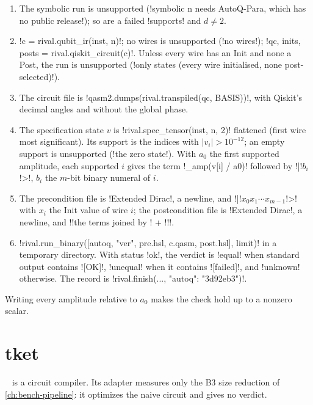 \begin{algorithm}\label{alg:bench-tools-autoq}
\begin{enumerate}
\item The symbolic run is unsupported (\code!symbolic n needs AutoQ-Para, which has no public release!); so are a failed \py!supports! and $d\neq2$.
\item \py!c = rival.qubit_ir(inst, n)!; no wires is unsupported (\code!no wires!); \py!qc, inits, posts = rival.qiskit_circuit(c)!. Unless every wire has an Init and none a Post, the run is unsupported (\code!only states (every wire initialised, none post-selected)!).
\item The circuit file is \py!qasm2.dumps(rival.transpiled(qc, BASIS))!, with Qiskit's decimal angles and without the global phase.
\item The specification state $v$ is \py!rival.spec_tensor(inst, n, 2)! flattened (first wire most significant). Its support is the indices with $|v_i|>10^{-12}$; an empty support is unsupported (\code!the zero state!). With $a_0$ the first supported amplitude, each supported $i$ gives the term \py!_amp(v[i] / a0)! followed by \code!|!$b_i$\code!>!, $b_i$ the $m$-bit binary numeral of $i$.
\item The precondition file  is \code!Extended Dirac!, a newline, and \code!{|!$x_0x_1\cdots x_{m-1}$\code!>}! with $x_i$ the Init value of wire $i$; the postcondition file  is \code!Extended Dirac!, a newline, and \code!{!the terms joined by \code! + !\code!}!.
\item \py!rival.run_binary([autoq, "ver", pre.hsl, c.qasm, post.hsl], limit)! in a temporary directory. With status \code!ok!, the verdict is \code!equal! when standard output contains \code![OK]!, \code!unequal! when it contains \code![failed]!, and \code!unknown! otherwise. The record is \py!rival.finish(..., {"autoq": "3d92eb3"})!.
\end{enumerate}
Writing every amplitude relative to $a_0$ makes the check hold up to a nonzero scalar.
\end{algorithm}

\section{tket}\label{sec:bench-tools-tket}

~\cite{sivarajah2021tket} is a circuit compiler. Its adapter measures only the B3 size reduction of \cref{ch:bench-pipeline}: it optimizes the naive circuit and gives no verdict.

